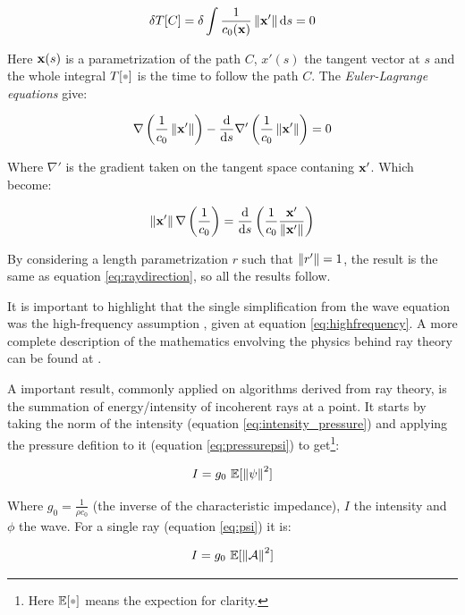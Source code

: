 \begin{equation*}
\delta T[C] = \delta \int \frac{1}{c_0(\mathrm{\mathbf{x}})}
\left\lVert\mathrm{\mathbf{x}}'\right\rVert \mathrm{d} s = 0
\end{equation*}

Here $\mathrm{\mathbf{x}}(s)$ is a parametrization of the path $C$, $x'(s)$ the tangent
vector at $s$ and the whole integral $T[\parm]$ is the time to follow the path
$C$. The \textit{Euler-Lagrange equations} give:


\begin{equation*}
\nabla\left(\frac{1}{c_0}\left\lVert\mathrm{\mathbf{x}}'\right\rVert\right) - \frac{\mathrm{d}}{\mathrm{d} s}
\nabla'\left(\frac{1}{c_0} \left\lVert\mathrm{\mathbf{x}}'\right\rVert\right) = 0
\end{equation*}

Where $\nabla'$ is the gradient taken on the tangent space contaning
$\mathrm{\mathbf{x}}'$.
Which become:

\begin{equation*}
\left\lVert\mathrm{\mathbf{x}}'\right\rVert\nabla\left(\frac{1}{c_0}\right) =
\frac{\mathrm{d}}{\mathrm{d} s}\left( \frac{1}{c_0}
\frac{\mathrm{\mathbf{x}}'}{\left\lVert\mathrm{\mathbf{x}}'\right\rVert}\right)
\end{equation*}

By considering a length parametrization $r$ such that $\left\lVert r'\right\rVert=1$, the
result is the same as equation \ref{eq:raydirection}, so all the results follow.

It is important to highlight that the single simplification from the wave
equation was the high-frequency assumption \cite{national1969physics}, given at
equation \ref{eq:highfrequency}. A more complete description of the mathematics
envolving the physics behind ray theory can be found at \citet{Lefebvre}.

A important result, commonly applied on algorithms derived from ray theory, is
the summation of energy/intensity of incoherent rays at a point. It starts by
taking the norm of the intensity (equation \ref{eq:intensity_pressure}) and applying the
pressure defition to it (equation \ref{eq:pressurepsi}) to get\footnote{Here
$\mathbb{E}[\parm]$ means the expection for clarity.}:


\begin{equation}\label{eq:intensity_psi}
I = g_0~\mathbb{E}[\left\lVert\psi\right\rVert^2]
\end{equation}

Where $g_0 = \tfrac{1}{\rho c_0}$ (the inverse of the characteristic impedance),
$I$ the intensity and $\phi$ the wave.
For a single ray (equation \ref{eq:psi}) it is:

\begin{equation*}
I = g_0~\mathbb{E}[\left\lVert\mathcal{A}\right\rVert^2]
\end{equation*}

